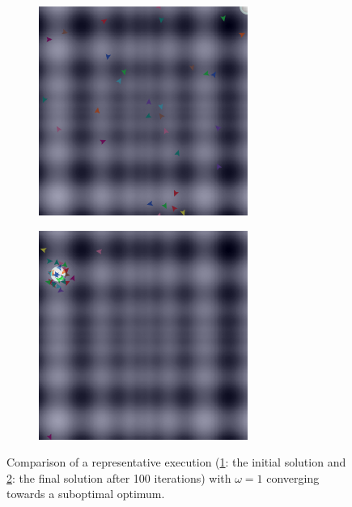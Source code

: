 \documentclass[12pt]{article}
\begin{document}
\begin{figure}
\begin{subfigure}[c]{0.5\textwidth}
\centering
\includegraphics[width=0.75\textwidth]{figures/ex3/wrong-optimum-init.png}
\label{fig:ex3-example-a}
\end{subfigure}
\begin{subfigure}[c]{0.5\textwidth}
\centering
\includegraphics[width=0.75\textwidth]{figures/ex3/wrong-optimum.png}
\label{fig:ex3-example-b}
\end{subfigure}

\caption{Comparison of a representative execution (\ref{fig:ex3-example-a}: the initial solution and \ref{fig:ex3-example-b}: the final solution after 100 iterations) with $\omega=1$ converging towards a suboptimal optimum.}
\label{fig:ex3-example}

\end{figure}
\end{document}
